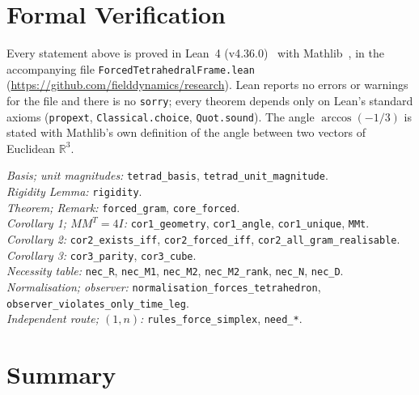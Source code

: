\documentclass[twocolumn]{iopjournal}
\begin{document}

\section*{Formal Verification}

Every statement above is proved in Lean~4
(v4.36.0)~\cite{Lean4} with Mathlib~\cite{Mathlib}, in the
accompanying file \texttt{ForcedTetrahedralFrame.lean}
(\url{https://github.com/fielddynamics/research}). Lean reports no
errors or warnings for the file and there is no \texttt{sorry}; every
theorem depends only on Lean's standard axioms (\texttt{propext},
\texttt{Classical.choice}, \texttt{Quot.sound}). The angle
$\arccos(-1/3)$ is stated with Mathlib's own definition of the angle
between two vectors of Euclidean $\mathbb{R}^3$.

{\footnotesize
\begin{flushleft}
\emph{Basis; unit magnitudes:} \texttt{tetrad\_basis}, \texttt{tetrad\_unit\_magnitude}.\\
\emph{Rigidity Lemma:} \texttt{rigidity}.\\
\emph{Theorem; Remark:} \texttt{forced\_gram}, \texttt{core\_forced}.\\
\emph{Corollary 1; $MM^T = 4I$:} \texttt{cor1\_geometry}, \texttt{cor1\_angle}, \texttt{cor1\_unique}, \texttt{MMt}.\\
\emph{Corollary 2:} \texttt{cor2\_exists\_iff}, \texttt{cor2\_forced\_iff}, \texttt{cor2\_all\_gram\_realisable}.\\
\emph{Corollary 3:} \texttt{cor3\_parity}, \texttt{cor3\_cube}.\\
\emph{Necessity table:} \texttt{nec\_R}, \texttt{nec\_M1}, \texttt{nec\_M2}, \texttt{nec\_M2\_rank}, \texttt{nec\_N}, \texttt{nec\_D}.\\
\emph{Normalisation; observer:} \texttt{normalisation\_forces\_tetrahedron}, \texttt{observer\_violates\_only\_time\_leg}.\\
\emph{Independent route; $(1,n)$:} \texttt{rules\_force\_simplex}, \texttt{need\_*}.
\end{flushleft}}

\section*{Summary}
\end{document}

